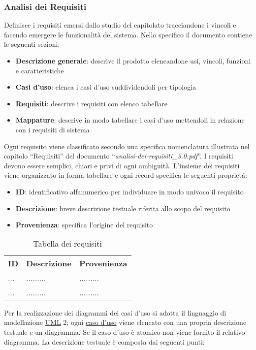 \documentclass[a4paper,11pt]{article}
\begin{document}
\subsubsection{Analisi dei Requisiti}
Definisce i requisiti emersi dallo studio del capitolato tracciandone i vincoli e facendo emergere le funzionalit\`a del sistema. Nello specifico il documento contiene le seguenti sezioni:
\begin{itemize}
\item \textbf{Descrizione generale}: descrive il prodotto elencandone usi, vincoli, funzioni e caratteristiche
\item \textbf{Casi d'uso}: elenca i casi d'uso suddividendoli per tipologia
\item \textbf{Requisiti}: descrive i requisiti con elenco tabellare
\item \textbf{Mappature}: descrive in modo tabellare i casi d'uso mettendoli in relazione con i requisiti di sistema
\end{itemize}
Ogni requisito viene classificato secondo una specifica nomenclatura illustrata nel capitolo ``Requisiti'' del documento ``\textit{analisi-dei-requisiti\_3.0.pdf}''.
I requisiti devono essere semplici, chiari e privi di ogni ambiguit\`a. L'insieme dei requisiti viene organizzato in forma tabellare e ogni record specifica le seguenti propriet\`a:
\begin{itemize}
\item \textbf{ID}: identificativo alfanumerico per individuare in modo univoco il requisito
\item \textbf{Descrizione}: breve descrizione testuale riferita allo scopo del requisito
\item \textbf{Provenienza}: specifica l'origine del requisito
\end{itemize}
\begin{table}[h!]
\begin{tabularx}{\textwidth}{XXX}
ID & Descrizione & Provenienza \\
\toprule
... & ......... & ......... \\
\midrule
... & ......... & ......... \\
\midrule
\end{tabularx}
\caption{Tabella dei requisiti}
\end{table}
\vspace{3 mm}
Per la realizzazione dei diagrammi dei casi d'uso si adotta il linguaggio di modellazione \underline{UML} 2; ogni \underline{caso d'uso} viene elencato con una propria descrizione testuale e un diagramma. Se il caso d'uso \`e atomico non viene fornito il relativo diagramma. La descrizione testuale \`e composta dai seguenti punti:
\end{document}
